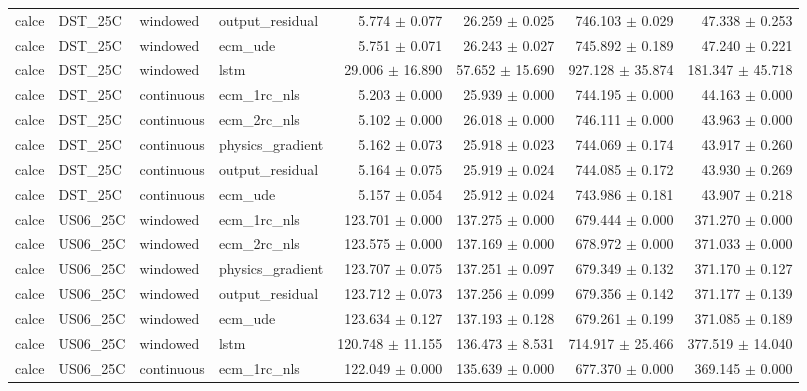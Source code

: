 \begin{longtable}{llllrrrr}
calce & DST\_25C & windowed & output\_residual & 5.774 $\pm$ 0.077 & 26.259 $\pm$ 0.025 & 746.103 $\pm$ 0.029 & 47.338 $\pm$ 0.253 \\
calce & DST\_25C & windowed & ecm\_ude & 5.751 $\pm$ 0.071 & 26.243 $\pm$ 0.027 & 745.892 $\pm$ 0.189 & 47.240 $\pm$ 0.221 \\
calce & DST\_25C & windowed & lstm & 29.006 $\pm$ 16.890 & 57.652 $\pm$ 15.690 & 927.128 $\pm$ 35.874 & 181.347 $\pm$ 45.718 \\
calce & DST\_25C & continuous & ecm\_1rc\_nls & 5.203 $\pm$ 0.000 & 25.939 $\pm$ 0.000 & 744.195 $\pm$ 0.000 & 44.163 $\pm$ 0.000 \\
calce & DST\_25C & continuous & ecm\_2rc\_nls & 5.102 $\pm$ 0.000 & 26.018 $\pm$ 0.000 & 746.111 $\pm$ 0.000 & 43.963 $\pm$ 0.000 \\
calce & DST\_25C & continuous & physics\_gradient & 5.162 $\pm$ 0.073 & 25.918 $\pm$ 0.023 & 744.069 $\pm$ 0.174 & 43.917 $\pm$ 0.260 \\
calce & DST\_25C & continuous & output\_residual & 5.164 $\pm$ 0.075 & 25.919 $\pm$ 0.024 & 744.085 $\pm$ 0.172 & 43.930 $\pm$ 0.269 \\
calce & DST\_25C & continuous & ecm\_ude & 5.157 $\pm$ 0.054 & 25.912 $\pm$ 0.024 & 743.986 $\pm$ 0.181 & 43.907 $\pm$ 0.218 \\
calce & US06\_25C & windowed & ecm\_1rc\_nls & 123.701 $\pm$ 0.000 & 137.275 $\pm$ 0.000 & 679.444 $\pm$ 0.000 & 371.270 $\pm$ 0.000 \\
calce & US06\_25C & windowed & ecm\_2rc\_nls & 123.575 $\pm$ 0.000 & 137.169 $\pm$ 0.000 & 678.972 $\pm$ 0.000 & 371.033 $\pm$ 0.000 \\
calce & US06\_25C & windowed & physics\_gradient & 123.707 $\pm$ 0.075 & 137.251 $\pm$ 0.097 & 679.349 $\pm$ 0.132 & 371.170 $\pm$ 0.127 \\
calce & US06\_25C & windowed & output\_residual & 123.712 $\pm$ 0.073 & 137.256 $\pm$ 0.099 & 679.356 $\pm$ 0.142 & 371.177 $\pm$ 0.139 \\
calce & US06\_25C & windowed & ecm\_ude & 123.634 $\pm$ 0.127 & 137.193 $\pm$ 0.128 & 679.261 $\pm$ 0.199 & 371.085 $\pm$ 0.189 \\
calce & US06\_25C & windowed & lstm & 120.748 $\pm$ 11.155 & 136.473 $\pm$ 8.531 & 714.917 $\pm$ 25.466 & 377.519 $\pm$ 14.040 \\
calce & US06\_25C & continuous & ecm\_1rc\_nls & 122.049 $\pm$ 0.000 & 135.639 $\pm$ 0.000 & 677.370 $\pm$ 0.000 & 369.145 $\pm$ 0.000 \\

\end{longtable}

